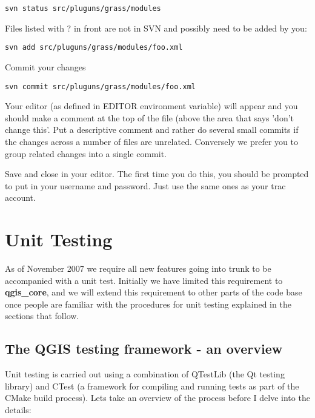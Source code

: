 \begin{verbatim}
svn status src/pluguns/grass/modules
\end{verbatim}

Files listed with ? in front are not in SVN and possibly need to be added by
you:

\begin{verbatim}
svn add src/pluguns/grass/modules/foo.xml
\end{verbatim}

Commit your changes

\begin{verbatim}
svn commit src/pluguns/grass/modules/foo.xml
\end{verbatim}

Your editor (as defined in EDITOR environment variable) will appear and you
should make a comment at the top of the file (above the area that says 'don't
change this'. Put a descriptive comment and rather do several small commits if
the changes across a number of files are unrelated. Conversely we prefer you to
group related changes into a single commit.

Save and close in your editor. The first time you do this, you should be
prompted to put in your username and password. Just use the same ones as your
trac account.


\hypertarget{toc47}{}
\section{Unit Testing}
As of November 2007 we require all new features going into trunk to be
accompanied with a unit test. Initially we have limited this requirement to
\textbf{qgis\_core}, and we will extend this requirement to other parts of the code base
once people are familiar with the procedures for unit testing explained in the
sections that follow.

\hypertarget{toc48}{}
\subsection{The QGIS testing framework  - an overview}
Unit testing is carried out using a combination of QTestLib (the Qt testing
library) and CTest (a framework for compiling and running tests as part of the
CMake build process).  Lets take an overview of the process before I delve into
the details:

